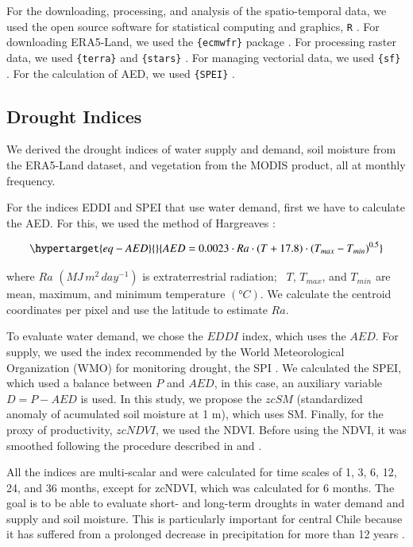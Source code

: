 \documentclass[
  number,
  preprint,
  3p,
  onecolumn]{elsarticle}
\begin{document}
For the downloading, processing, and analysis of the spatio-temporal
data, we used the open source software for statistical computing and
graphics, \texttt{R} \citep{R2023}. For downloading ERA5-Land, we used
the \texttt{\{ecmwfr\}} package \citep{Hufkens2019}. For processing
raster data, we used \texttt{\{terra\}} \citep{Hijmans2023} and
\texttt{\{stars\}} \citep{Pebesma2023}. For managing vectorial data, we
used \texttt{\{sf\}} \citep{Pebesma2018}. For the calculation of AED, we
used \texttt{\{SPEI\}} \citep{Bergueria2023}.

\hypertarget{drought-indices}{%
\subsection{Drought Indices}\label{drought-indices}}

We derived the drought indices of water supply and demand, soil moisture
from the ERA5-Land dataset, and vegetation from the MODIS product, all
at monthly frequency.

For the indices EDDI and SPEI that use water demand, first we have to
calculate the AED. For this, we used the method of Hargreaves
\citep{Hargreaves1994}:

\begin{equation}\protect\hypertarget{eq-AED}{}{AED = 0.0023\cdot Ra\cdot (T+17.8)\cdot (T_{max}-T_{min})^{0.5}}\label{eq-AED}\end{equation}

where \(Ra\) \((MJ\,m^2\, day^{-1})\) is extraterrestrial radiation;
~\(T\), \(T_{max}\), and \(T_{min}\) are mean, maximum, and minimum
temperature \((°C)\). We calculate the centroid coordinates per pixel
and use the latitude to estimate \(Ra\).

To evaluate water demand, we chose the \(EDDI\)
\citep{Hobbins2016, McEvoy2016} index, which uses the \(AED\). For
supply, we used the index recommended by the World Meteorological
Organization (WMO) for monitoring drought, the SPI \citep{Mckee1993}. We
calculated the SPEI, which used a balance between \(P\) and \(AED\), in
this case, an auxiliary variable \(D = P-AED\) is used. In this study,
we propose the \(zcSM\) (standardized anomaly of acumulated soil
moisture at 1 m), which uses SM. Finally, for the proxy of productivity,
\(zcNDVI\), we used the NDVI. Before using the NDVI, it was smoothed
following the procedure described in \citep{Zambrano2018} and
\citep{Zambrano2016}.

All the indices are multi-scalar and were calculated for time scales of
1, 3, 6, 12, 24, and 36 months, except for zcNDVI, which was calculated
for 6 months. The goal is to be able to evaluate short- and long-term
droughts in water demand and supply and soil moisture. This is
particularly important for central Chile because it has suffered from a
prolonged decrease in precipitation for more than 12 years
\citep{Garreaud2020, Boisier2018, Garreaud2017}.
\end{document}
